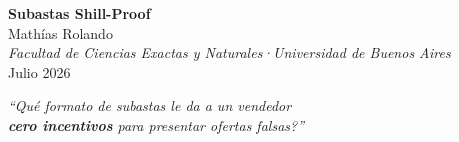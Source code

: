\documentclass[20pt]{extarticle}
\begin{document}
\color{ink}

\noindent
\begin{tcolorbox}[header,width=\paperwidth]
  \begin{minipage}[c]{0.58\linewidth}
    {\fontsize{92}{105}\selectfont\color{white}\textbf{Subastas Shill-Proof}}\\[8mm]
    {\fontsize{34}{42}\selectfont\color{white!70!ink}
      Mathías Rolando\\[5mm]}
    {\fontsize{24}{30}\selectfont\color{white!50!ink}\itshape
      Facultad de Ciencias Exactas y Naturales\enspace·\enspace Universidad de Buenos Aires\\[3mm]}
    {\fontsize{20}{25}\selectfont\color{white!40!ink}
      Julio 2026}
  \end{minipage}%
  \hfill
  \begin{minipage}[c]{0.8\linewidth}
    \raggedright
    {\fontsize{30}{40}\selectfont\color{white!70!ink}\itshape
      ``Qué formato de subastas le da a un vendedor \\
      \textbf{cero incentivos} para presentar ofertas falsas?''}
  \end{minipage}
\end{tcolorbox}
\end{document}
